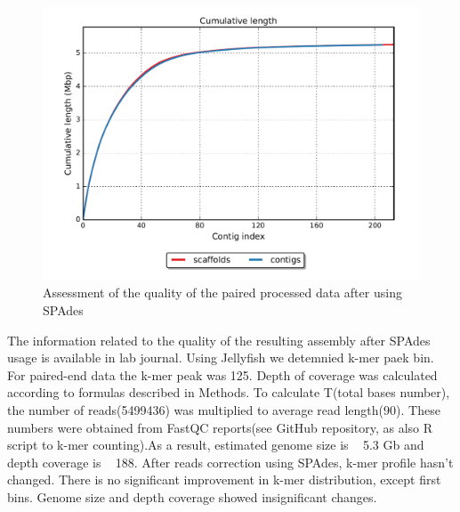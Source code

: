 \documentclass{article}
\begin{document}
\begin{figure}[h]
	\centering
	\includegraphics[scale=0.5 ]{images/consca.png} 
	\centering \caption{Assessment of the quality of the paired processed data after using SPAdes}
	\label{scacof}
\end{figure}
The information related to the quality of the resulting assembly after SPAdes usage is available in lab journal.
Using Jellyfish we detemnied k-mer paek bin. For paired-end data the k-mer peak was 125. Depth of coverage was calculated according to formulas described in Methods. To calculate T(total bases number), the number of reads(5499436) was multiplied to average read length(90). These numbers were obtained from FastQC reports(see GitHub repository, as also R script to k-mer counting).As a result, estimated genome size is ~ 5.3 Gb and depth coverage is ~ 188.
After reads correction using SPAdes, k-mer profile hasn't changed. There is no significant improvement in k-mer distribution, except first bins. Genome size and depth coverage showed insignificant changes.
\end{document}
